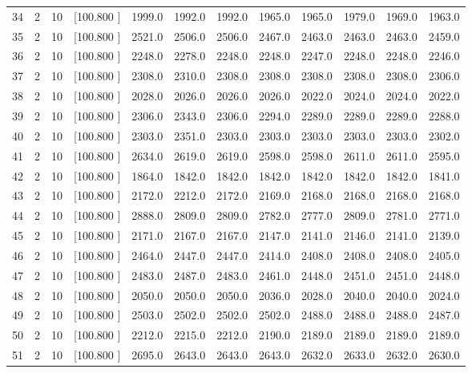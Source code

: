 \documentclass[12pt,a4paper]{article}
\begin{document}
\begin{center}
{\begin{tabular}{r r r r r r r r r r r r}
  34&  2& 10&[100.800   ]&  1999.0&  1992.0&  1992.0&  1965.0&  1965.0&  1979.0&  1969.0&  1963.0\\[-0.02in]
  35&  2& 10&[100.800   ]&  2521.0&  2506.0&  2506.0&  2467.0&  2463.0&  2463.0&  2463.0&  2459.0\\[-0.02in]
  36&  2& 10&[100.800   ]&  2248.0&  2278.0&  2248.0&  2248.0&  2247.0&  2248.0&  2248.0&  2246.0\\[-0.02in]
  37&  2& 10&[100.800   ]&  2308.0&  2310.0&  2308.0&  2308.0&  2308.0&  2308.0&  2308.0&  2306.0\\[-0.02in]
  38&  2& 10&[100.800   ]&  2028.0&  2026.0&  2026.0&  2026.0&  2022.0&  2024.0&  2024.0&  2022.0\\[-0.02in]
  39&  2& 10&[100.800   ]&  2306.0&  2343.0&  2306.0&  2294.0&  2289.0&  2289.0&  2289.0&  2288.0\\[-0.02in]
  40&  2& 10&[100.800   ]&  2303.0&  2351.0&  2303.0&  2303.0&  2303.0&  2303.0&  2303.0&  2302.0\\[-0.02in]
  41&  2& 10&[100.800   ]&  2634.0&  2619.0&  2619.0&  2598.0&  2598.0&  2611.0&  2611.0&  2595.0\\[-0.02in]
  42&  2& 10&[100.800   ]&  1864.0&  1842.0&  1842.0&  1842.0&  1842.0&  1842.0&  1842.0&  1841.0\\[-0.02in]
  43&  2& 10&[100.800   ]&  2172.0&  2212.0&  2172.0&  2169.0&  2168.0&  2168.0&  2168.0&  2168.0\\[-0.02in]
  44&  2& 10&[100.800   ]&  2888.0&  2809.0&  2809.0&  2782.0&  2777.0&  2809.0&  2781.0&  2771.0\\[-0.02in]
  45&  2& 10&[100.800   ]&  2171.0&  2167.0&  2167.0&  2147.0&  2141.0&  2146.0&  2141.0&  2139.0\\[-0.02in]
  46&  2& 10&[100.800   ]&  2464.0&  2447.0&  2447.0&  2414.0&  2408.0&  2408.0&  2408.0&  2405.0\\[-0.02in]
  47&  2& 10&[100.800   ]&  2483.0&  2487.0&  2483.0&  2461.0&  2448.0&  2451.0&  2451.0&  2448.0\\[-0.02in]
  48&  2& 10&[100.800   ]&  2050.0&  2050.0&  2050.0&  2036.0&  2028.0&  2040.0&  2040.0&  2024.0\\[-0.02in]
  49&  2& 10&[100.800   ]&  2503.0&  2502.0&  2502.0&  2502.0&  2488.0&  2488.0&  2488.0&  2487.0\\[-0.02in]
  50&  2& 10&[100.800   ]&  2212.0&  2215.0&  2212.0&  2190.0&  2189.0&  2189.0&  2189.0&  2189.0\\[-0.02in]
  51&  2& 10&[100.800   ]&  2695.0&  2643.0&  2643.0&  2643.0&  2632.0&  2633.0&  2632.0&  2630.0\\[-0.02in]

\end{tabular}}
\end{center}
\end{document}
